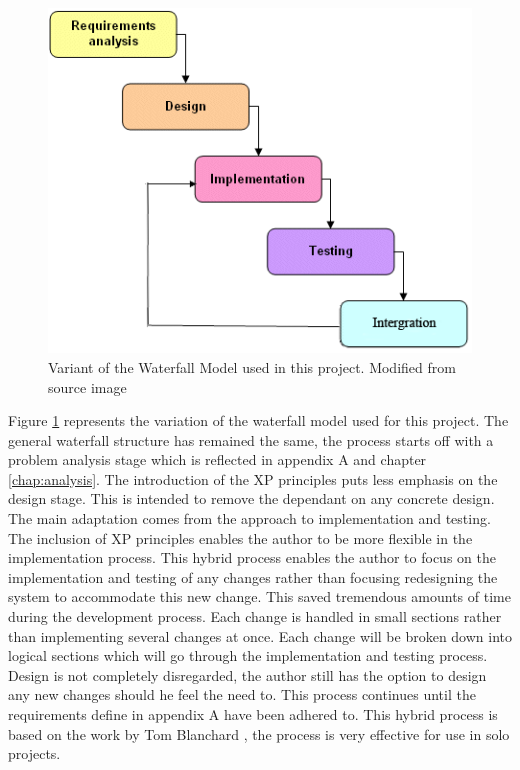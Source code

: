 \begin{figure}[H]
\centering
\includegraphics[scale=0.7]{Images/chapter3/waterfallmodel}
\caption[Waterfall Model Variant]{Variant of the Waterfall Model used in this project. Modified from source image \cite{waterfall:image}}
\label{fig:waterfall}
\end{figure}

Figure \ref{fig:waterfall} represents the variation of the waterfall model used for this project. The general waterfall structure has remained the same, the process starts off with a problem analysis stage which is reflected in appendix A and chapter \ref{chap:analysis}. The introduction of the XP principles puts less emphasis on the design stage. This is intended to remove the dependant on any concrete design. The main adaptation comes from the approach to implementation and testing. The inclusion of XP principles enables the author to be more flexible in the implementation process. This hybrid process enables the author to focus on the implementation and testing of any changes rather than focusing redesigning the system to accommodate this new change. This saved tremendous amounts of time during the development process. Each change is handled in small sections rather than implementing several changes at once. Each change will be broken down into logical sections which will go through the implementation and testing process. Design is not completely disregarded, the author still has the option to design any new changes should he feel the need to. This process continues until the requirements define in appendix A have been adhered to. This hybrid process is based on the work by Tom Blanchard \cite{tblanch:diss}, the process is very effective for use in solo projects.
